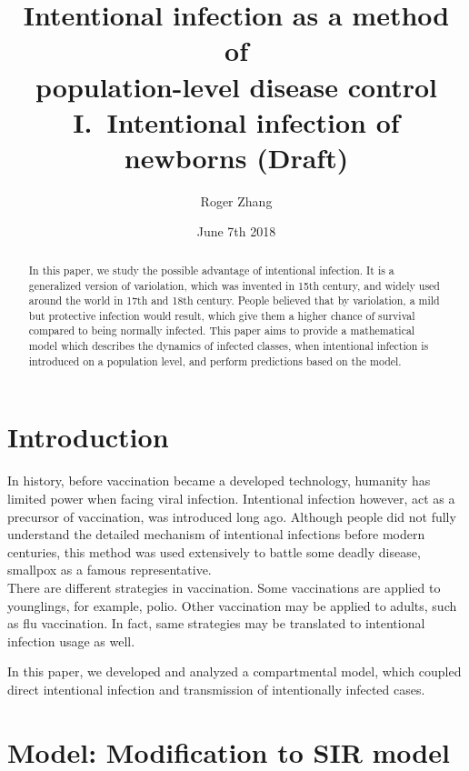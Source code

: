 \documentclass[12pt]{article}
\title{Intentional infection as a method of\\population-level disease
  control\\I.~Intentional infection of newborns (Draft)}
\author{Roger Zhang}
\date{June 7th 2018}
\begin{document}
\maketitle
\begin{abstract}
In this paper, we study the possible advantage of intentional infection. It is a generalized version of variolation, which was invented in 15th century, and widely used around the world in 17th and 18th century. People believed that by variolation, a mild but protective infection would result, which give them a higher chance of survival compared to being normally infected. This paper aims to provide a mathematical model which describes the dynamics of infected classes, when intentional infection is introduced on a population level, and perform predictions based on the model.
\end{abstract}
\tableofcontents

\section{Introduction}
In history, before vaccination became a developed technology, humanity has limited power when facing viral infection. Intentional infection however, act as a precursor of vaccination, was introduced long ago. Although people did not fully understand the detailed mechanism of intentional infections before modern centuries, this method was used extensively to battle some deadly disease, smallpox as a famous representative.\\
There are different strategies in vaccination. Some vaccinations are applied to younglings, for example, polio. Other vaccination may be applied to adults, such as flu vaccination. In fact, same strategies may be translated to intentional infection usage as well.

In this paper, we developed and analyzed a compartmental model, which
coupled direct intentional infection and transmission of intentionally infected cases.
\section{Model: Modification to SIR model}
\end{document}
